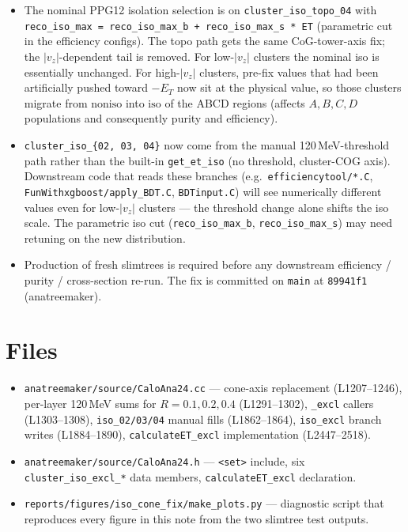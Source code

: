 \documentclass[11pt,a4paper]{article}
\newcommand{\branch}[1]{\texttt{\small #1}}
\begin{document}
\begin{itemize}
  \item The nominal PPG12 isolation selection is on
    \branch{cluster\_iso\_topo\_04} with
    \verb|reco_iso_max = reco_iso_max_b + reco_iso_max_s * ET| (parametric cut
    in the efficiency configs). The topo path gets the same CoG-tower-axis
    fix; the $|v_z|$-dependent tail is removed. For low-$|v_z|$ clusters the
    nominal iso is essentially unchanged. For high-$|v_z|$ clusters, pre-fix
    values that had been artificially pushed toward $-E_T$ now sit at the
    physical value, so those clusters migrate from
    $\text{noniso}$ into $\text{iso}$ of the ABCD regions (affects
    $A, B, C, D$ populations and consequently purity and efficiency).
  \item \branch{cluster\_iso\_\{02, 03, 04\}} now come from the manual
    120\,MeV-threshold path rather than the built-in
    \verb|get_et_iso| (no threshold, cluster-COG axis). Downstream code that
    reads these branches (e.g.\ \branch{efficiencytool/*.C},
    \branch{FunWithxgboost/apply\_BDT.C}, \branch{BDTinput.C}) will see
    numerically different values even for low-$|v_z|$ clusters --- the
    threshold change alone shifts the iso scale. The parametric iso cut
    (\verb|reco_iso_max_b|, \verb|reco_iso_max_s|) may need retuning on the
    new distribution.
  \item Production of fresh slimtrees is required before any downstream
    efficiency / purity / cross-section re-run. The fix is committed on
    \texttt{main} at \texttt{89941f1} (anatreemaker).
\end{itemize}

\section*{Files}

\begin{itemize}
  \item \branch{anatreemaker/source/CaloAna24.cc} --- cone-axis replacement
    (L1207--1246), per-layer 120\,MeV sums for $R = 0.1, 0.2, 0.4$
    (L1291--1302), \branch{\_excl} callers (L1303--1308),
    \branch{iso\_02/03/04} manual fills (L1862--1864),
    \branch{iso\_excl} branch writes (L1884--1890),
    \branch{calculateET\_excl} implementation (L2447--2518).
  \item \branch{anatreemaker/source/CaloAna24.h} --- \branch{<set>} include,
    six \branch{cluster\_iso\_excl\_*} data members,
    \branch{calculateET\_excl} declaration.
  \item \branch{reports/figures/iso\_cone\_fix/make\_plots.py} --- diagnostic
    script that reproduces every figure in this note from the two
    slimtree test outputs.
\end{itemize}
\end{document}

